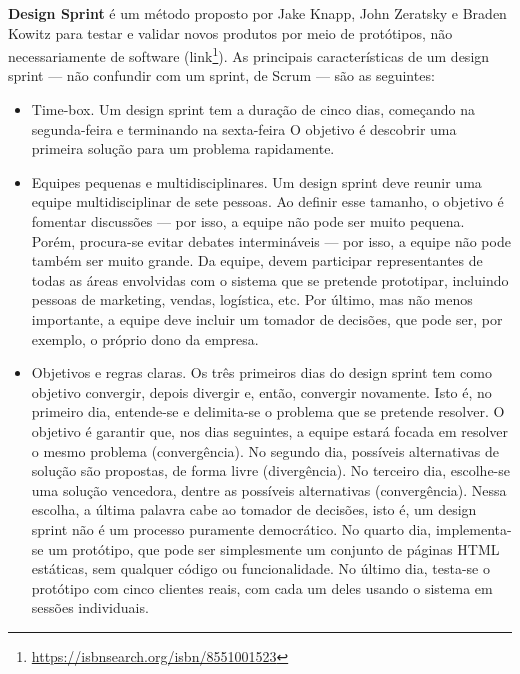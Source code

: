 \documentclass[
  11pt,
  twoside]{book}
\DeclareRobustCommand{\href}[2]{#2\footnote{\url{#1}}}
\begin{document}
 

\textbf{Design Sprint} é um método proposto por Jake Knapp, John
Zeratsky e Braden Kowitz para testar e validar novos produtos por meio
de protótipos, não necessariamente de software
(\href{https://isbnsearch.org/isbn/8551001523}{link}). As principais
características de um design sprint --- não confundir com um sprint, de
Scrum --- são as seguintes:

\begin{itemize}
\item
  Time-box. Um design sprint tem a duração de cinco dias, começando na
  segunda-feira e terminando na sexta-feira O objetivo é descobrir uma
  primeira solução para um problema rapidamente.
\item
  Equipes pequenas e multidisciplinares. Um design sprint deve reunir
  uma equipe multidisciplinar de sete pessoas. Ao definir esse tamanho,
  o objetivo é fomentar discussões --- por isso, a equipe não pode ser
  muito pequena. Porém, procura-se evitar debates intermináveis --- por
  isso, a equipe não pode também ser muito grande. Da equipe, devem
  participar representantes de todas as áreas envolvidas com o sistema
  que se pretende prototipar, incluindo pessoas de marketing, vendas,
  logística, etc. Por último, mas não menos importante, a equipe deve
  incluir um tomador de decisões, que pode ser, por exemplo, o próprio
  dono da empresa.
\item
  Objetivos e regras claras. Os três primeiros dias do design sprint tem
  como objetivo convergir, depois divergir e, então, convergir
  novamente. Isto é, no primeiro dia, entende-se e delimita-se o
  problema que se pretende resolver. O objetivo é garantir que, nos dias
  seguintes, a equipe estará focada em resolver o mesmo problema
  (convergência). No segundo dia, possíveis alternativas de solução são
  propostas, de forma livre (divergência). No terceiro dia, escolhe-se
  uma solução vencedora, dentre as possíveis alternativas
  (convergência). Nessa escolha, a última palavra cabe ao tomador de
  decisões, isto é, um design sprint não é um processo puramente
  democrático. No quarto dia, implementa-se um protótipo, que pode ser
  simplesmente um conjunto de páginas HTML estáticas, sem qualquer
  código ou funcionalidade. No último dia, testa-se o protótipo com
  cinco clientes reais, com cada um deles usando o sistema em sessões
  individuais.
\end{itemize}
\end{document}

